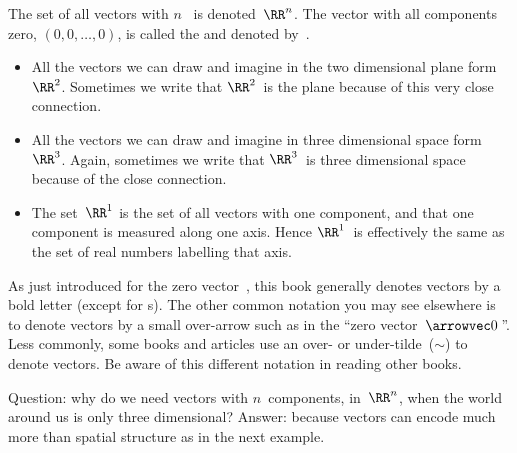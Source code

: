 \begin{definition} \label{def:rRn}
The set of all vectors with \(n\)~ is denoted~\(\RR^n\).
The vector with all components zero,  \((0,0,\ldots,0)\), is called the  and denoted by~\ov.
\end{definition}

\begin{example} 
\begin{itemize}
\item All the vectors we can draw and imagine in the two dimensional plane form~\(\RR^2\).  
Sometimes we write that \(\RR^2\)~is the plane because of this very close connection.

\item All the vectors we can draw and imagine in three dimensional space form~\(\RR^3\).  
Again, sometimes we write that \(\RR^3\)~is three dimensional space because of the close connection. 

\item The set~\(\RR^1\) is the set of all vectors with one component, and that one component is measured along one axis.  
Hence \(\RR^1\)~is effectively the same as the set of real numbers labelling that axis.
\blackqed
\end{itemize}
\end{example}


As just introduced for the zero vector~\ov, this book generally denotes vectors by a bold letter (except for s).
The other common notation you may see elsewhere is to denote vectors by a small over-arrow such as in the ``zero vector~\(\arrowvec0\)\,''.
Less commonly, some books and articles use an over- or under-tilde~(\(\sim\)) to denote vectors.
Be aware of this different notation in reading other books.



Question: why do we need vectors with \(n\)~components, in~\(\RR^n\), when the world around us is only three dimensional?
Answer: because vectors can encode much more than spatial structure as in the next example. 



